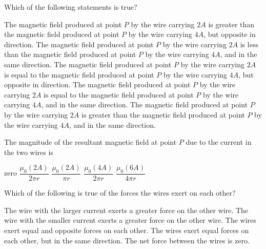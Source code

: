 \documentclass{../../../oss-ap12ibhl}
\begin{document}
\begin{questions}
  \question Which of the following statements is true?
  \begin{choices}
    \choice The magnetic field produced at point $P$ by the wire carrying $2A$
    is greater than the magnetic field produced at point $P$ by the wire
    carrying $4A$, but opposite in direction.
    \choice The magnetic field produced at point $P$ by the wire carrying $2A$
    is less than the magnetic field produced at point $P$ by the wire
    carrying $4A$, and in the same direction.
    \choice The magnetic field produced at point $P$ by the wire carrying $2A$
    is equal to the magnetic field produced at point $P$ by the wire
    carrying $4A$, but opposite in direction.
    \choice The magnetic field produced at point $P$ by the wire carrying $2A$
    is equal to the magnetic field produced at point $P$ by the wire
    carrying $4A$, and in the same direction.
    \choice The magnetic field produced at point $P$ by the wire carrying $2A$
    is greater than the magnetic field produced at point $P$ by the wire
    carrying $4A$, and in the same direction.
  \end{choices}
  \label{q:2wires1}
    
  \question The magnitude of the resultant magnetic field at point $P$ due to
  the current in the two wires is
  \begin{choices}
    \choice zero
    \choice $\dfrac{\mu_0(2A)}{2\pi r}$
    \choice $\dfrac{\mu_0(2A)}{\pi r}$
    \choice $\dfrac{\mu_0(4A)}{2\pi r}$
    \choice $\dfrac{\mu_0(6A)}{4\pi r}$
    \end{choices}
  \label{q:2wires2}


  \question Which of the following is true of the forces the wires exert on each
  other?
  \begin{choices}
    \choice The wire with the larger current exerts a greater force on the other
    wire.
    \choice The wire with the smaller current exerts a greater force on the
    other wire.
    \choice The wires exert equal and opposite forces on each other.
    \choice The wires exert equal forces on each other, but in the same
    direction.
    \choice The net force between the wires is zero.
  \end{choices}
  \label{q:2curr1}
    

\end{questions}
\end{document}
